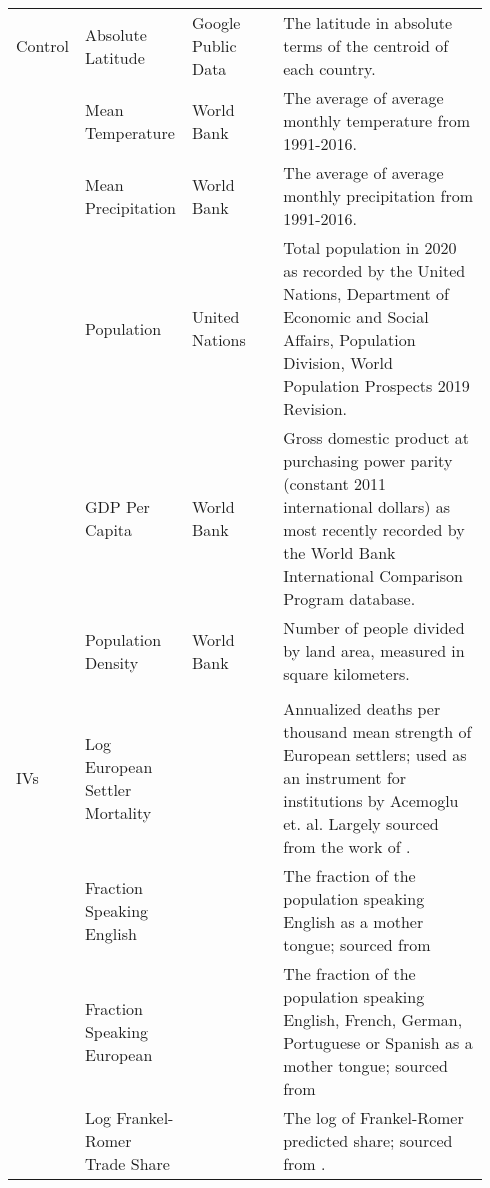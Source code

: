 \begin{landscape}
\begin{table}[!htbp]
\begin{tabularx}{\linewidth}{p{0.07\linewidth} p{0.2\linewidth} p{0.2\linewidth} p{0.47\linewidth}}
    Control & Absolute Latitude & Google Public Data & The latitude in absolute terms of the centroid of each country. \\
  & Mean Temperature & World Bank & The average of average monthly temperature from 1991-2016. \\
    & Mean Precipitation & World Bank & The average of average monthly precipitation from 1991-2016. \\
    & Population & United Nations & Total population in 2020 as recorded by the United Nations, Department of Economic and Social Affairs, Population Division, World Population Prospects 2019 Revision. \\
    & GDP Per Capita & World Bank & Gross domestic product at purchasing power parity (constant 2011 international dollars) as most recently recorded by the World Bank International Comparison Program database.\\
    & Population Density & World Bank & Number of people divided by land area, measured in square kilometers. \\ \hline \\[-1.8ex]

    IVs & Log European Settler Mortality & \citet{ajr}  & Annualized deaths per thousand mean strength of European settlers; used as an instrument for institutions by Acemoglu et. al. Largely sourced from the work of \citet{curtin_1989}.\\
    & Fraction Speaking English & \citet{hj} & The fraction of the population speaking English as a mother tongue; sourced from \citet{hunter, gunnemark} \\
    & Fraction Speaking European & \citet{hj} & The fraction of the population speaking English, French, German, Portuguese or Spanish as a mother tongue; sourced from \citet{hunter, gunnemark}\\
    & Log Frankel-Romer Trade Share & \citet{hj} & The log of Frankel-Romer predicted share; sourced from \citet{frankelromer}.\\ \hline

\end{tabularx}
\end{table}
\end{landscape}



